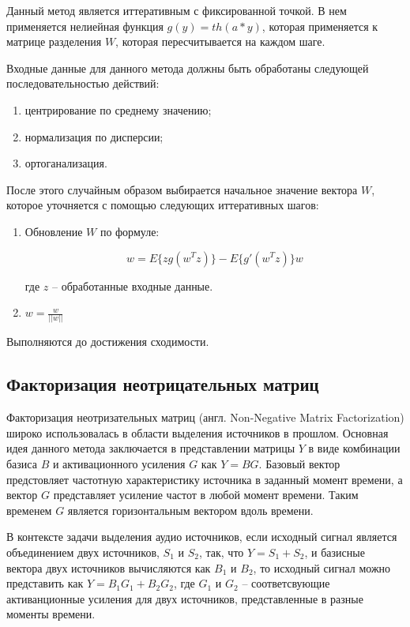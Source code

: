 Данный метод является иттеративным с фиксированной точкой. В нем применяется нелиейная функция $g(y) = th(a * y)$, которая применяется к матрице разделения $W$, которая пересчитывается на каждом шаге.

Входные данные для данного метода должны быть обработаны следующей последовательностью действий:

\begin{enumerate}
	\item центрирование по среднему значению;
	\item нормализация по дисперсии;
	\item ортоганализация.
\end{enumerate}

После этого случайным образом выбирается начальное значение вектора $W$, которое уточняется с помощью следующих иттеративных шагов:

\begin{enumerate}
	\item Обновление $W$ по формуле:
	
	\begin{equation}
		w = E\{zg(w^Tz)\} - E\{g'(w^Tz)\}w
	\end{equation}
	
	где $z$ -- обработанные входные данные.
	\item $w = \frac{w}{|| w ||}$
\end{enumerate}

Выполняются до достижения сходимости.

\subsection{Факторизация неотрицательных матриц}

Факторизация неотризательных матриц (англ. Non-Negative Matrix Factorization) широко использовалась в области выделения источников в прошлом. Основная идея данного метода заключается в представлении матрицы $Y$ в виде комбинации базиса $B$ и активационного усиления $G$ как $Y=BG$. Базовый вектор предстовляет частотную характеристику источника в заданный момент времени, а вектор $G$ представляет усиление частот в любой момент времени. Таким временем $G$ является горизонтальным вектором вдоль времени.

В контексте задачи выделения аудио источников, если исходный сигнал является объединением двух источников, $S_1$ и $S_2$, так, что $Y = S_1 + S_2$, и базисные вектора двух источников вычисляются как $B_1$ и $B_2$, то исходный сигнал можно представить как $Y = B_1 G_1 + B_2 G_2$, где $G_1$ и $G_2$ -- соответсвующие активанционные усиления для двух источников, представленные в разные моменты времени. 

